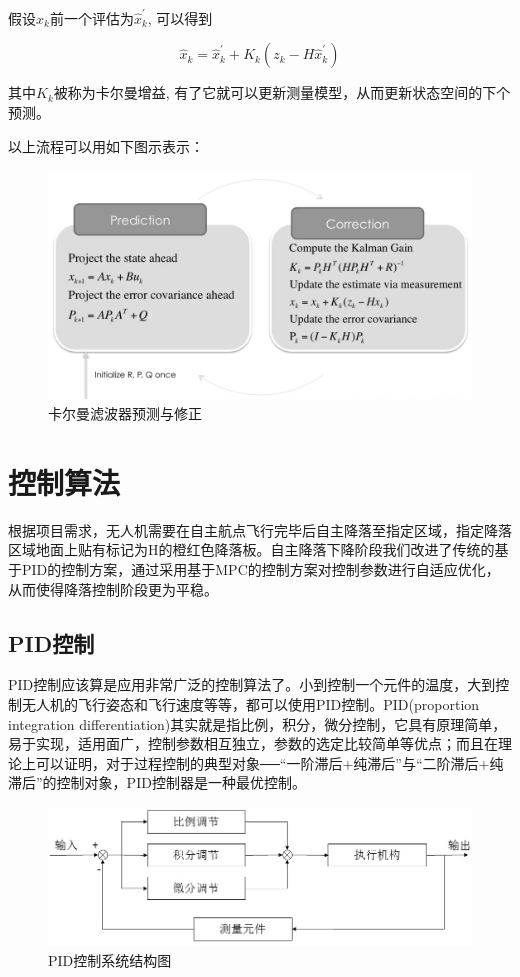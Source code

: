 假设$\hat{x}_{k}$前一个评估为$\hat{x}_{k}^{\prime}$, 可以得到

$$
\hat{x}_{k}=\hat{x}_{k}^{\prime}+K_{k}\left(z_{k}-H \hat{x}_{k}^{\prime}\right)
$$

其中$K_{k}$被称为卡尔曼增益, 有了它就可以更新测量模型，从而更新状态空间的下个预测。

以上流程可以用如下图示表示：

\begin{figure}[ht]
  \centering
  \includegraphics[width=0.8\linewidth]{./Figure/Kalman_Prediction_and_Correction.png}
  \caption{卡尔曼滤波器预测与修正}\label{Fig:xd1}
\end{figure}

\section{控制算法}

根据项目需求，无人机需要在自主航点飞行完毕后自主降落至指定区域，指定降落区域地面上贴有标记为H的橙红色降落板。自主降落下降阶段我们改进了传统的基于PID的控制方案，通过采用基于MPC的控制方案对控制参数进行自适应优化，从而使得降落控制阶段更为平稳。

\subsection{PID控制}

PID控制应该算是应用非常广泛的控制算法了。小到控制一个元件的温度，大到控制无人机的飞行姿态和飞行速度等等，都可以使用PID控制。PID(proportion integration differentiation)其实就是指比例，积分，微分控制，它具有原理简单，易于实现，适用面广，控制参数相互独立，参数的选定比较简单等优点；而且在理论上可以证明，对于过程控制的典型对象──“一阶滞后+纯滞后”与“二阶滞后+纯滞后”的控制对象，PID控制器是一种最优控制。

\begin{figure}[ht]
  \centering
  \includegraphics[width=0.8\linewidth]{./Figure/PID_Graph.png}
  \caption{PID控制系统结构图}\label{Fig:xd1}
\end{figure}

